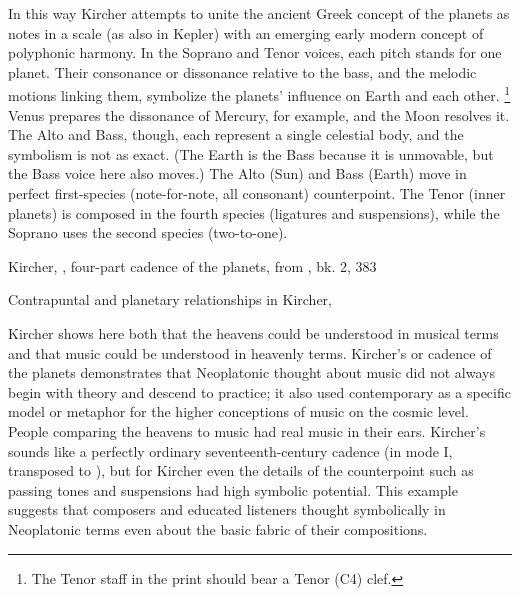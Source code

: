 In this way Kircher attempts to unite the ancient Greek concept of the planets
as notes in a scale (as also in Kepler) with an emerging early modern concept of
polyphonic harmony.
In the Soprano and Tenor voices, each pitch stands for one planet.
Their consonance or dissonance relative to the bass, and the melodic motions
linking them, symbolize the planets' influence on Earth and each other.%
    \footnote{The Tenor staff in the print should bear a Tenor (C4) clef.}
Venus prepares the dissonance of Mercury, for example, and the Moon resolves it.
The Alto and Bass, though, each represent a single celestial body, and the
symbolism is not as exact.
(The Earth is the Bass because it is unmovable, but the Bass voice here also
moves.)
The Alto (Sun) and Bass (Earth) move in perfect first-species (note-for-note,
all consonant) counterpoint.
The Tenor (inner planets) is composed in the fourth species (ligatures and
suspensions), while the Soprano uses the second species (two-to-one).


{Kircher, ,
four-part cadence of the planets, from , bk. 2,
383}

{Contrapuntal and planetary relationships in Kircher, }

Kircher shows here both that the heavens could be understood in musical terms
and that music could be understood in heavenly terms.
Kircher's  or cadence of the planets demonstrates that
Neoplatonic thought about music did not always begin with theory and descend to
practice; it also used contemporary  as a specific
model or metaphor for the higher conceptions of music on the cosmic level. 
People comparing the heavens to music had real music in their ears.
Kircher's  sounds like a perfectly ordinary seventeenth-century
cadence (in mode I, transposed to ), but for Kircher even
the  details of the counterpoint such as passing tones and
suspensions had high symbolic potential.
This example suggests that composers and educated listeners thought symbolically
in Neoplatonic terms even about the basic fabric of their compositions.

